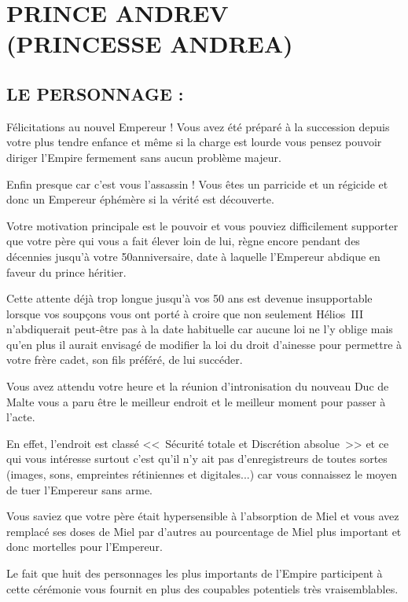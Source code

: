 \documentclass[14pt,twocolumn]{extarticle}
\begin{document}
\section{PRINCE ANDREV\\(PRINCESSE ANDREA)}

\subsection{LE PERSONNAGE :}

Félicitations au nouvel Empereur ! Vous avez été préparé à la succession depuis
votre plus tendre enfance et même si la charge est lourde vous pensez pouvoir
diriger l'Empire fermement sans aucun problème majeur.

Enfin presque car c'est vous l'assassin ! Vous êtes un parricide et un régicide
et donc un Empereur éphémère si la vérité est découverte.

Votre motivation principale est le pouvoir et vous pouviez difficilement
supporter que votre père qui vous a fait élever loin de lui, règne encore
pendant des décennies jusqu'à votre 50\ieme anniversaire, date à laquelle 
l'Empereur abdique en faveur du prince héritier.

Cette attente déjà trop longue jusqu'à vos 50 ans est devenue insupportable
lorsque vos soupçons vous ont porté à croire que non seulement Hélios~III
n'abdiquerait peut-être pas à la date habituelle car aucune loi ne l'y oblige
mais qu'en plus il aurait envisagé de modifier la loi du droit d'ainesse pour
permettre à votre frère cadet, son fils préféré, de lui succéder.

Vous avez attendu votre heure et la réunion d'intronisation du nouveau Duc de
Malte vous a paru être le meilleur endroit et le meilleur moment pour passer à
l'acte.

En effet, l'endroit est classé <<~Sécurité totale et Discrétion absolue~>> et
ce qui vous intéresse surtout c'est qu'il n'y ait pas d'enregistreurs de toutes
sortes (images, sons, empreintes rétiniennes et digitales...) car vous
connaissez le moyen de tuer l'Empereur sans arme.

Vous saviez que votre père était hypersensible à l'absorption de Miel et vous
avez remplacé ses doses de Miel par d'autres au pourcentage de Miel plus
important et donc mortelles pour l'Empereur.

Le fait que huit des personnages les plus importants de l'Empire participent à
cette cérémonie vous fournit en plus des coupables potentiels très
vraisemblables.
\end{document}
